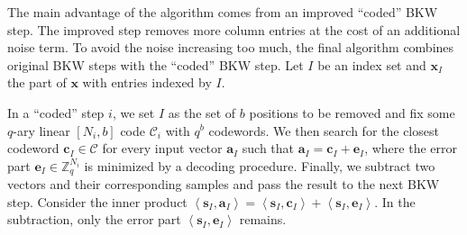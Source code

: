 The main advantage of the algorithm comes from an improved ``coded'' BKW step. The improved step removes more column entries at the cost of an additional noise term. To avoid the noise increasing too much, the final algorithm combines original BKW steps with the ``coded'' BKW step. Let $I$ be an index set and $\mathbf{x}_I$ the part of $\mathbf{x}$ with entries indexed by $I$.

In a ``coded'' step $i$, we set $I$ as the set of $b$ positions to be removed and fix some $q$-ary linear $\left[N_i, b\right]$ code $\mathcal{C}_i$ with $q^b$ codewords. We then search for the closest codeword $\mathbf{c}_I \in \mathcal{C}$ for every input vector $\mathbf{a}_I$ such that $\mathbf{a}_I = \mathbf{c}_I + \mathbf{e}_I$, where the error part $\mathbf{e}_I \in \mathbb{Z}_q^{N_i}$ is minimized by a decoding procedure. Finally, we subtract two vectors and their corresponding samples and pass the result to the next BKW step. Consider the inner product $\left\langle \mathbf{s}_{I}, \mathbf{a}_{I} \right\rangle = \left\langle \mathbf{s}_{I}, \mathbf{c}_{I} \right\rangle + \left\langle \mathbf{s}_{I}, \mathbf{e}_{I} \right\rangle$. In the subtraction, only the error part $\left\langle \mathbf{s}_{I}, \mathbf{e}_{I} \right\rangle$ remains. %








